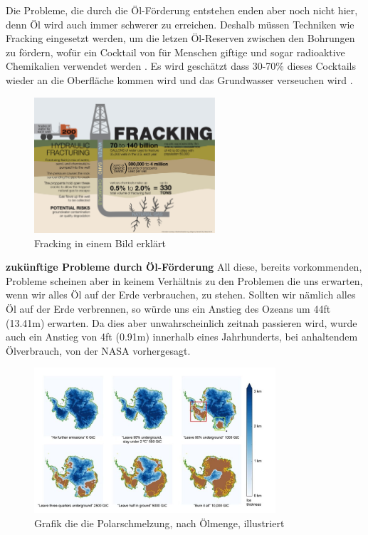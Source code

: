 Die Probleme, die durch die Öl-Förderung entstehen enden aber noch nicht hier, denn Öl wird auch immer schwerer zu erreichen. Deshalb müssen Techniken wie Fracking eingesetzt werden, um die letzen Öl-Reserven zwischen den Bohrungen zu fördern, wofür ein Cocktail von für Menschen giftige und sogar radioaktive Chemikalien verwendet werden \cite{SIMR.CH2-motorwirkungsgrad.FrackingChemicals}. Es wird geschätzt dass 30-70\% dieses Cocktails wieder an die Oberfläche kommen wird und das Grundwasser verseuchen wird \cite{SIMR.CH2-motorwirkungsgrad.FrackingGroundwater}.

\begin{figure}[!htb]\centering
	\includegraphics[width=0.6\textwidth]{images/frackingInfographic}
	\caption{Fracking in einem Bild erklärt \cite{SIMR.CH2-motorwirkungsgrad.frackingDescription}}\label{Fig:imgFrackingDesc}
\end{figure}

\newpage
\textbf{zukünftige Probleme durch Öl-Förderung\nextline}
All diese, bereits vorkommenden, Probleme scheinen aber in keinem Verhältnis zu den Problemen die uns erwarten, wenn wir alles Öl auf der Erde verbrauchen, zu stehen. Sollten wir nämlich alles Öl auf der Erde verbrennen, so würde uns ein Anstieg des Ozeans um 44ft (13.41m) erwarten. \cite{SIMR.CH2-motorwirkungsgrad.SeaLevelRiseAllOilBurnt} Da dies aber unwahrscheinlich zeitnah passieren wird, wurde auch ein Anstieg von 4ft (0.91m) innerhalb eines Jahrhunderts, bei anhaltendem Ölverbrauch, von der NASA vorhergesagt. \cite{SIMR.CH2-motorwirkungsgrad.SeaLevelRiseCentury}

\begin{figure}[!htb]\centering
	\includegraphics[width=0.8\textwidth]{images/greenlandSeaLevel}
	\caption{Grafik die die Polarschmelzung, nach Ölmenge, illustriert \cite{SIMR.CH2-motorwirkungsgrad.SeaLevelRiseAllOilBurnt}}\label{Fig:imgGreenlandMelting}
\end{figure}

